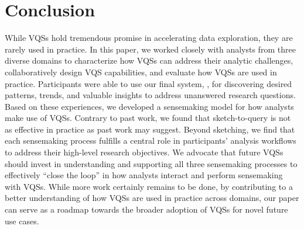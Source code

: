  \section{Conclusion\label{sec:conclusion}}
 While VQSs hold tremendous promise in accelerating data exploration, they are rarely used in practice. In this paper, we worked closely with analysts from three diverse domains to characterize how VQSs can address their analytic challenges, collaboratively design VQS capabilities, and evaluate how VQSs are used in practice. Participants were able to use our final system, \zvpp, for discovering desired patterns, trends, and valuable insights to address unanswered research questions. Based on these experiences, we developed a sensemaking model for how analysts make use of VQSs. Contrary to past work, we found that sketch-to-query is not as effective in practice as past work may suggest. Beyond sketching, we find that each sensemaking process fulfills a central role in participants' analysis workflows to address their high-level research objectives. We advocate that future VQSs should invest in understanding and supporting all three sensemaking processes to effectively ``close the loop'' in how analysts interact and perform sensemaking with VQSs. While more work certainly remains to be done, by contributing to a better understanding of how VQSs are used in practice across domains, our paper can serve as a roadmap towards the broader adoption of VQSs for novel future use cases.
